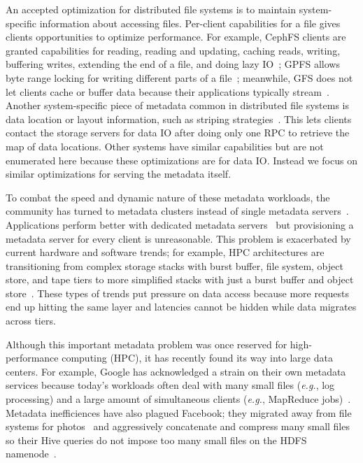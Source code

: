 An accepted optimization for distributed file systems is to maintain
system-specific information about accessing files.  Per-client capabilities for
a file gives clients opportunities to optimize performance.  For example,
CephFS clients are granted capabilities for reading, reading and updating,
caching reads, writing, buffering writes, extending the end of a file, and
doing lazy IO~\cite{docs:cephcaps}; GPFS allows byte range locking for writing
different parts of a file~\cite{schmuck:fast2002-gpfs}; meanwhile, GFS does not
let clients cache or buffer data because their applications typically
stream~\cite{ghemawat:sosp2003-gfs}. Another system-specific piece of metadata
common in distributed file systems is data location or layout information, such
as striping strategies~\cite{nagle_panasas_2004, welch:fast08-panasas,
wang:tech09-lustre, docs:cephstripe, sinnamohideen:atc2010-ursa,
ghemawat:sosp2003-gfs}. This lets clients contact the storage servers for data
IO after doing only one RPC to retrieve the map of data locations.  Other
systems have similar capabilities but are not enumerated here because these
optimizations are for data IO.  Instead we focus on similar optimizations for
serving the metadata itself.

To combat the speed and dynamic nature of these metadata workloads, the
community has turned to metadata clusters instead of single metadata
servers~\cite{patil:fast2011-giga+,weil:osdi2006-ceph,weil:sc2004-dyn-metadata,
sinnamohideen:atc2010-ursa, xing:sc2009-skyfs}.  
 Applications perform better with dedicated metadata
servers~\cite{sevilla:sc15-mantle, ren:sc2014-indexfs} but provisioning a
metadata server for every client is unreasonable. This problem is exacerbated
by current hardware and software trends; for example, HPC architectures are
transitioning from complex storage stacks with burst buffer, file system,
object store, and tape tiers to more simplified stacks with just a burst buffer
and object store~\cite{bent:login16-hpc-trends}. These types of trends put
pressure on data access because more requests end up hitting the same layer and
latencies cannot be hidden while data migrates across tiers.

Although this important metadata problem was once reserved for high-performance
computing (HPC), it has recently found its way into large data centers. For
example, Google has acknowledged a strain on their own metadata services
because today's workloads often deal with many small files ({\it e.g.}, log
processing) and a large amount of simultaneous clients ({\it e.g.}, MapReduce
jobs)~\cite{mckusick:acm2010-gfs-evolution}. Metadata inefficiences have also
plagued Facebook; they migrated away from file systems for
photos~\cite{beaver:osdi2010-haystack} and aggressively concatenate and
compress many small files so their Hive queries do not impose too many small
files on the HDFS namenode~\cite{thusoo:sigmod2010-facebook-infrastructure}. 

